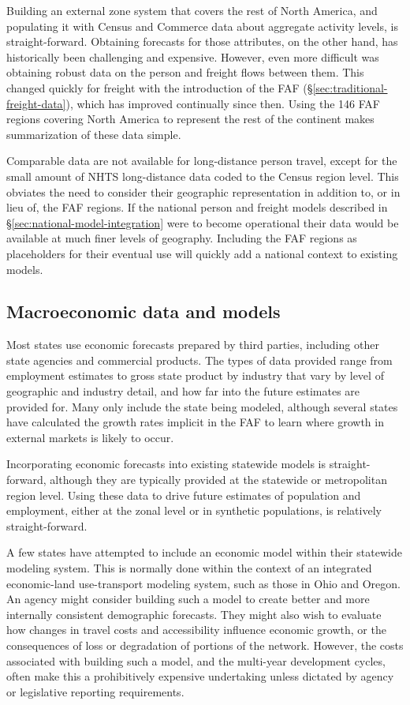 Building an external zone system that covers the rest of North America, and populating it with Census and Commerce data about aggregate activity levels, is straight-forward. Obtaining forecasts for those attributes, on the other hand, has historically been challenging and expensive. However, even more difficult was obtaining robust data on the person and freight flows between them. This changed quickly for freight with the introduction of the FAF (\S\ref{sec:traditional-freight-data}), which has improved continually since then. Using the 146 FAF regions covering North America to represent the rest of the continent makes summarization of these data simple.

Comparable data are not available for long-distance person travel, except for the small amount of NHTS long-distance data coded to the Census region level. This obviates the need to consider their geographic representation in addition to, or in lieu of, the FAF regions. If the national person and freight models described in \S\ref{sec:national-model-integration} were to become operational their data would be available at much finer levels of geography. Including the FAF regions as placeholders for their eventual use will quickly add a national context to existing models.

\subsection{Macroeconomic data and models}

Most states use economic forecasts prepared by third parties, including other state agencies and commercial products. The types of data provided range from employment estimates to gross state product by industry that vary by level of geographic and industry detail, and how far into the future estimates are provided for. Many only include the state being modeled, although several states have calculated the growth rates implicit in the FAF to learn where growth in external markets is likely to occur.

Incorporating economic forecasts into existing statewide models is straight-forward, although they are typically provided at the statewide or metropolitan region level. Using these data to drive future estimates of population and employment, either at the zonal level or in synthetic populations, is relatively straight-forward.

A few states have attempted to include an economic model within their statewide modeling system. This is normally done within the context of an integrated economic-land use-transport modeling system, such as those in Ohio and Oregon. An agency might consider building such a model to create better and more internally consistent demographic forecasts. They might also wish to evaluate how changes in travel costs and accessibility influence economic growth, or the consequences of loss or degradation of portions of the network. However, the costs associated with building such a model, and the multi-year development cycles, often make this a prohibitively expensive undertaking unless dictated by agency or legislative reporting requirements.

